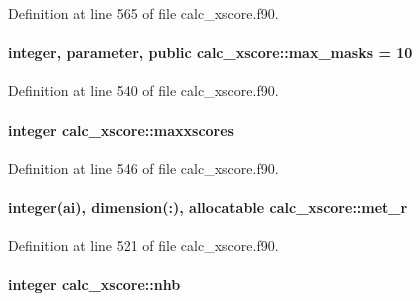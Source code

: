 Definition at line 565 of file calc\-\_\-xscore.\-f90.

\hypertarget{classcalc__xscore_a64db4ecf19efbbb299ff1a02b5226cb5}{
\paragraph[{max\-\_\-masks}]{\setlength{\rightskip}{0pt plus 5cm}integer, parameter, public calc\-\_\-xscore\-::max\-\_\-masks = 10}}\label{classcalc__xscore_a64db4ecf19efbbb299ff1a02b5226cb5}


Definition at line 540 of file calc\-\_\-xscore.\-f90.

\hypertarget{classcalc__xscore_aa0c3f01df3b71dc62bde71795e981f2a}{
\paragraph[{maxxscores}]{\setlength{\rightskip}{0pt plus 5cm}integer calc\-\_\-xscore\-::maxxscores}}\label{classcalc__xscore_aa0c3f01df3b71dc62bde71795e981f2a}


Definition at line 546 of file calc\-\_\-xscore.\-f90.

\hypertarget{classcalc__xscore_a983ee8b7fc3d10fbee5e7a6813d15237}{
\paragraph[{met\-\_\-r}]{\setlength{\rightskip}{0pt plus 5cm}integer(ai), dimension(\-:), allocatable calc\-\_\-xscore\-::met\-\_\-r}}\label{classcalc__xscore_a983ee8b7fc3d10fbee5e7a6813d15237}


Definition at line 521 of file calc\-\_\-xscore.\-f90.

\hypertarget{classcalc__xscore_aa4ece0e20bb585fbdda7d11682bcac6c}{
\paragraph[{nhb}]{\setlength{\rightskip}{0pt plus 5cm}integer calc\-\_\-xscore\-::nhb}}\label{classcalc__xscore_aa4ece0e20bb585fbdda7d11682bcac6c}


